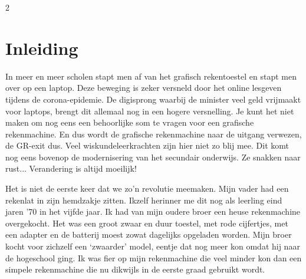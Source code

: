 

\startcontents[inhoudloep]	%

\begin{multicols}{2}
	
	\inhoudstafelloep			%
	
	\section{Inleiding}
In meer en meer scholen stapt men af van het grafisch rekentoestel en stapt men over op een laptop. Deze beweging is zeker versneld door het online lesgeven tijdens de corona-epidemie. De digisprong waarbij de minister veel geld vrijmaakt voor laptops, brengt dit allemaal nog in een hogere versnelling. Je kunt het niet maken om nog eens een behoorlijke som te vragen voor een grafische rekenmachine. En dus wordt de grafische rekenmachine naar de uitgang verwezen, de GR-exit dus. Veel wiskundeleerkrachten zijn hier niet zo blij mee. Dit komt nog eens bovenop de modernisering van het secundair onderwijs. Ze snakken naar rust...  Verandering is altijd moeilijk!

Het is niet de eerste keer dat we zo’n revolutie meemaken. Mijn vader had een rekenlat in zijn hemdzakje zitten. Ikzelf herinner me dit nog als leerling eind jaren '70 in het vijfde jaar. Ik had van mijn oudere broer een heuse rekenmachine overgekocht. Het was een groot zwaar en duur toestel, met rode cijfertjes, met een adapter en de batterij moest zowat dagelijks opgeladen worden. Mijn broer kocht voor zichzelf een ‘zwaarder’ model, eentje dat nog meer kon omdat hij naar de hogeschool ging. Ik was fier op mijn rekenmachine die veel minder kon dan een simpele rekenmachine die nu dikwijls in de eerste graad gebruikt wordt.


\end{multicols}
